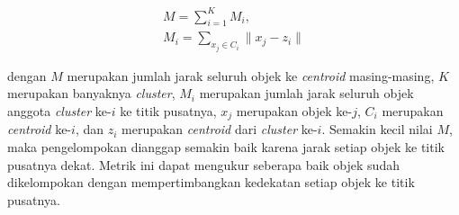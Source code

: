 \begin{equation}
\label{eq:intracluster}
	\begin{gathered}
	M=\sum_{i=1}^K M_i , \\
	M_i=\sum_{x_j\in C_i}\parallel x_j-z_i\parallel
	\end{gathered}
\end{equation}

dengan $M$ merupakan jumlah jarak seluruh objek ke \textit{centroid} masing-masing, $K$ merupakan banyaknya \textit{cluster}, $M_i$ merupakan jumlah jarak seluruh objek anggota \textit{cluster} ke-$i$ ke titik pusatnya, $x_j$ merupakan objek ke-$j$, $C_i$ merupakan \textit{centroid} ke-$i$, dan $z_i$ merupakan \textit{centroid} dari \textit{cluster} ke-$i$. Semakin kecil nilai $M$, maka pengelompokan dianggap semakin baik karena jarak setiap objek ke titik pusatnya dekat. Metrik ini dapat mengukur seberapa baik objek sudah dikelompokan dengan mempertimbangkan kedekatan setiap objek ke titik pusatnya.

